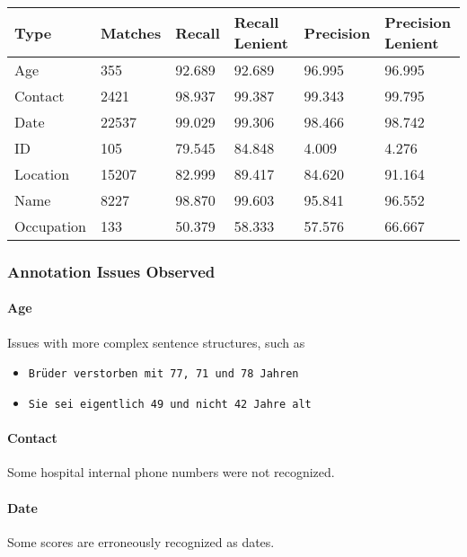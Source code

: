 \begin{longtable}[]{@{}llllll@{}}
\toprule\noalign{}
Type & Matches & Recall & Recall Lenient & Precision & Precision
Lenient \\
\midrule\noalign{}
\endhead
\bottomrule\noalign{}
\endlastfoot
Age & 355 & 92.689 & 92.689 & 96.995 & 96.995 \\
Contact & 2421 & 98.937 & 99.387 & 99.343 & 99.795 \\
Date & 22537 & 99.029 & 99.306 & 98.466 & 98.742 \\
ID & 105 & 79.545 & 84.848 & 4.009 & 4.276 \\
Location & 15207 & 82.999 & 89.417 & 84.620 & 91.164 \\
Name & 8227 & 98.870 & 99.603 & 95.841 & 96.552 \\
Occupation & 133 & 50.379 & 58.333 & 57.576 & 66.667 \\
\end{longtable}

\subsubsection{Annotation Issues
Observed}\label{annotation-issues-observed}

\paragraph{Age}\label{age}

Issues with more complex sentence structures, such as

\begin{itemize}
\tightlist
\item
  \texttt{Brüder\ verstorben\ mit\ 77,\ 71\ und\ 78\ Jahren}
\item
  \texttt{Sie\ sei\ eigentlich\ 49\ und\ nicht\ 42\ Jahre\ alt}
\end{itemize}

\paragraph{Contact}\label{contact}

Some hospital internal phone numbers were not recognized.

\paragraph{Date}\label{date}

Some scores are erroneously recognized as dates.

